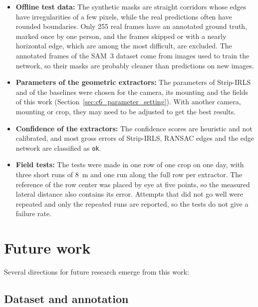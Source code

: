 \begin{itemize}
\item \textbf{Offline test data:} The synthetic masks are straight corridors whose edges have irregularities of a few pixels, while the real predictions often have rounded boundaries. Only 255 real frames have an annotated ground truth, marked once by one person, and the frames skipped or with a nearly horizontal edge, which are among the most difficult, are excluded. The annotated frames of the SAM~3 dataset come from images used to train the network, so their masks are probably cleaner than predictions on new images.

\item \textbf{Parameters of the geometric extractors:} The parameters of Strip-IRLS and of the baselines were chosen for the camera, its mounting and the fields of this work (Section~\ref{sec:c6_parameter_setting}). With another camera, mounting or crop, they may need to be adjusted to get the best results.

\item \textbf{Confidence of the extractors:} The confidence scores are heuristic and not calibrated, and most gross errors of Strip-IRLS, RANSAC edges and the edge network are classified as \texttt{ok}.

\item \textbf{Field tests:} The tests were made in one row of one crop on one day, with three short runs of 8~m and one run along the full row per extractor. The reference of the row center was placed by eye at five points, so the measured lateral distance also contains its error. Attempts that did not go well were repeated and only the repeated runs are reported, so the tests do not give a failure rate.
\end{itemize}

\section{Future work}
\label{sec:future_work}

Several directions for future research emerge from this work:

\subsection{Dataset and annotation}
\label{subsec:future_annotation}

